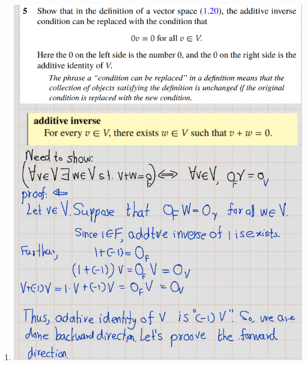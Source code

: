 \documentclass[
]{book}
\theoremstyle{definition}
\theoremstyle{definition}
\theoremstyle{definition}
\theoremstyle{definition}
\theoremstyle{remark}
\begin{document}
\begin{enumerate}
\def\labelenumi{\arabic{enumi}.}
\setcounter{enumi}{4}
\item
  \includegraphics{fig/Ex1B/Ex5-1.png}


\end{enumerate}
\end{document}
